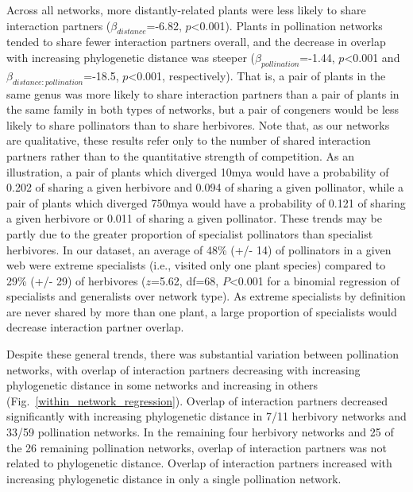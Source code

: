 \documentclass[12pt]{article}
\begin{document}
\begin{spacing}{1.5}
    Across all networks, more distantly-related plants were less likely to 
    share interaction partners ($\beta_{distance}$=-6.82, 
    $p$\textless0.001). Plants in pollination networks tended to share 
    fewer interaction partners overall, and the decrease in overlap with 
    increasing phylogenetic distance was steeper 
    ($\beta_{pollination}$=-1.44, $p$\textless0.001 and 
    $\beta_{distance:pollination}$=-18.5, $p$\textless0.001, respectively). 
    That is, a pair of plants in the same genus was more likely to share 
    interaction partners than a pair of plants in the same family in both 
    types of networks, but a pair of congeners would be less likely to 
    share pollinators than to share herbivores. Note that, as our networks 
    are qualitative, these results refer only to the number of shared interaction
    partners rather than to the quantitative strength of competition.
    As an illustration, a pair
    of plants which diverged 10mya would have a probability of 0.202 of sharing
    a given herbivore and 0.094 of sharing a given pollinator, while a 
    pair of plants which diverged 750mya would 
    have a probability of 0.121 of sharing a given herbivore or 
    0.011 of sharing a given pollinator.
    These trends may be partly 
    due to the greater proportion of specialist pollinators than specialist 
    herbivores. In our dataset, an average of 48\% (+/- 14) of pollinators 
    in a given web were extreme specialists (i.e., visited only one plant 
    species) compared to 29\% (+/- 29) of herbivores ($z$=5.62, df=68, 
    $P$\textless0.001 for a binomial regression of specialists and 
    generalists over network type). As extreme specialists by definition 
    are never shared by more than one plant, a large proportion of specialists
    would decrease interaction partner overlap.


    Despite these general trends, there was substantial variation between 
    pollination networks, with overlap of interaction partners decreasing 
    with increasing phylogenetic distance in some networks and increasing 
    in others (Fig.~\ref{within_network_regression}). Overlap of 
    interaction partners decreased significantly with increasing 
    phylogenetic distance in 7/11 herbivory networks and 33/59 
    pollination networks. In the remaining four herbivory networks and 
    25 of the 26 remaining pollination networks, overlap of interaction 
    partners was not related to phylogenetic distance. Overlap of 
    interaction partners increased with increasing phylogenetic distance 
    in only a single pollination network.%



\end{spacing}
\end{document}
